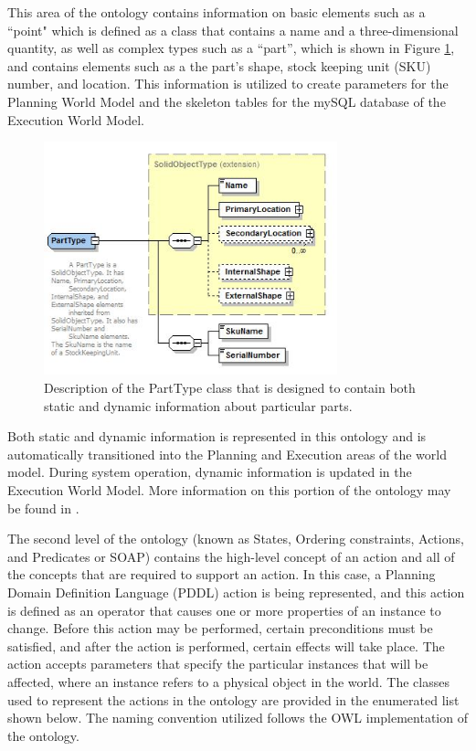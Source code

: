 This area of the ontology contains information on basic elements such as a ``point" which is defined as a class that contains a name 
and a three-dimensional quantity, as well as complex types such as a ``part'', which is
shown in Figure \ref{fig:part}, and
contains elements such as a the part's shape, stock keeping unit (SKU) number, and location. This information is utilized to create parameters for the Planning World
Model and the skeleton tables for the mySQL database of the Execution World Model.
%
\begin{figure}[htb!]
\begin{center}
\includegraphics[width=8.5cm]{images/Part.jpg}
\caption{Description of the PartType class that is designed to contain both static and dynamic information about particular parts.}
\label{fig:part}
\end{center}
\end{figure}
%
Both static and dynamic information is represented in this
ontology and is automatically transitioned into the Planning and Execution areas of the world model. During system
operation,  dynamic information is updated in the Execution World Model.
More information on this portion of the ontology may be found in \cite{Balakirsky2012-1}.


The second level of the ontology (known as States, Ordering constraints, Actions, and Predicates or SOAP) contains the high-level concept of an action and all of the concepts 
that are required to support an action. In this case, a Planning Domain Definition Language (PDDL) \cite{PDDL} action is being represented, and this action is defined
 as an operator that causes one or more properties of an 
instance to change. Before this action may be
performed, certain preconditions must be satisfied, and after the action is performed, certain effects will take place. The action accepts parameters that specify the particular
instances that will be affected, where an instance refers to a physical object in the world. The classes used to represent the actions in the ontology are provided in the
enumerated list shown below. The naming convention utilized follows the OWL \cite{OWLoverview} implementation of the ontology.

